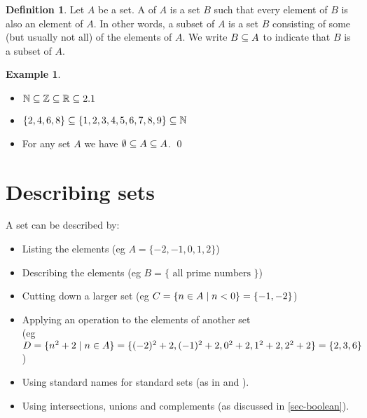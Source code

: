 \documentclass[a4paper]{book}
\theoremstyle{definition}
\newtheorem{definition}[theorem]{Definition}
\newtheorem{example}[theorem]{Example}
\begin{document}
\begin{definition}
 Let $A$ be a set.  A  of $A$ is a set $B$ such that
 every element of $B$ is also an element of $A$.  In other words, a
 subset of $A$ is a set $B$ consisting of some (but usually not all)
 of the elements of $A$.  We write $B\subseteq A$ to indicate that $B$ is a
 subset of $A$.
\end{definition}
\begin{example}
 \begin{itemize}
  \item ${\mathbb{N}}\subseteq{\mathbb{Z}}\subseteq{\mathbb{R}}\subseteq2.1$
  \item $\{2,4,6,8\}\subseteq\{1,2,3,4,5,6,7,8,9\}\subseteq{\mathbb{N}}$
  \item For any set $A$ we have $\emptyset\subseteq A\subseteq A$. \qed
 \end{itemize}
\end{example}

\section{Describing sets}\label{sec-sets-desc}

A set can be described by:
\begin{itemize}
 \item Listing the elements (eg $A=\{-2,-1,0,1,2\}$)
 \item Describing the elements 
  (eg $B=\{\text{ all prime numbers }\}$)
 \item Cutting down a larger set
  (eg $C=\{n\in A\;|\; n<0\}=\{-1,-2\}$)
 \item Applying an operation to the elements of another set \\
  (eg $D=\{n^2+2\;|\; n\in A\}=\{(-2)^2+2,(-1)^2+2,0^2+2,1^2+2,2^2+2\}=\{2,3,6\}$)
 \item Using standard names for standard sets (as in
   and ).
 \item Using intersections, unions and complements (as discussed in
  \autoref{sec-boolean}).
\end{itemize}
\end{document}
